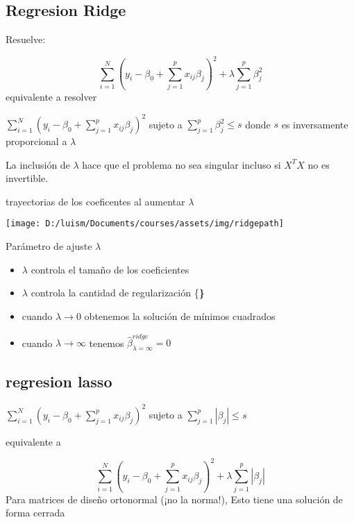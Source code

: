 \documentclass[
]{article}
\providecommand{\tightlist}{%
  \setlength{\itemsep}{0pt}\setlength{\parskip}{0pt}}
\begin{document}
\hypertarget{regresion-ridge}{%
\subsection{Regresion Ridge}\label{regresion-ridge}}

Resuelve:

\[\sum_{i=1}^N \left(y_i - \beta_0 + \sum_{j=1}^p x_{ij}\beta_j \right)^2 + \lambda \sum_{j=1}^p \beta_j^2\]
equivalente a resolver

\(\sum_{i=1}^N \left(y_i - \beta_0 + \sum_{j=1}^p x_{ij}\beta_j \right)^2\)
sujeto a \(\sum_{j=1}^p \beta_j^2 \leq s\) donde \(s\) es inversamente
proporcional a \(\lambda\)

La inclusión de \(\lambda\) hace que el problema no sea singular incluso
si \(X ^ TX\) no es invertible.

trayectorias de los coeficentes al aumentar \(\lambda\)

\begin{center}\texttt{[image: D:/luism/Documents/courses/assets/img/ridgepath]} \end{center}

Parámetro de ajuste \(\lambda\)

\begin{itemize}
\tightlist
\item
  \(\lambda\) controla el tamaño de los coeficientes
\item
  \(\lambda\) controla la cantidad de regularización \{\bf\}
\item
  cuando \(\lambda\rightarrow 0\) obtenemos la solución de mínimos
  cuadrados
\item
  cuando \(\lambda\rightarrow \infty\) tenemos
  \(\hat {\beta} _ {\lambda = \infty} ^ {ridge} = 0\)
\end{itemize}

\hypertarget{regresion-lasso}{%
\subsection{regresion lasso}\label{regresion-lasso}}

\(\sum_{i=1}^N \left(y_i - \beta_0 + \sum_{j=1}^p x_{ij}\beta_j \right)^2\)
sujeto a \(\sum_{j=1}^p |\beta_j| \leq s\)

equivalente a

\[\sum_{i=1}^N \left(y_i - \beta_0 + \sum_{j=1}^p x_{ij}\beta_j \right)^2 + \lambda \sum_{j=1}^p |\beta_j|\]
Para matrices de diseño ortonormal (¡no la norma!), Esto tiene una
solución de forma cerrada
\end{document}
